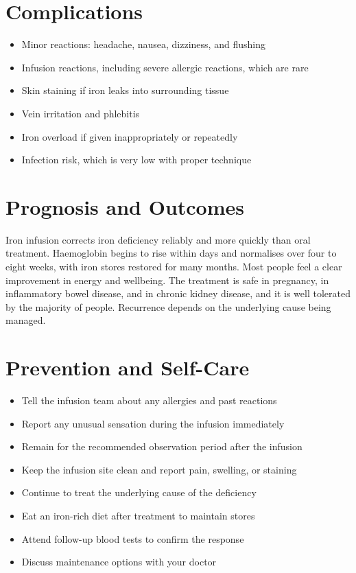 \section*{Complications}
\begin{itemize}
    \item Minor reactions: headache, nausea, dizziness, and flushing
    \item Infusion reactions, including severe allergic reactions, which are rare
    \item Skin staining if iron leaks into surrounding tissue
    \item Vein irritation and phlebitis
    \item Iron overload if given inappropriately or repeatedly
    \item Infection risk, which is very low with proper technique
\end{itemize}

\section*{Prognosis and Outcomes}
Iron infusion corrects iron deficiency reliably and more quickly than oral treatment. Haemoglobin begins to rise within days and normalises over four to eight weeks, with iron stores restored for many months. Most people feel a clear improvement in energy and wellbeing. The treatment is safe in pregnancy, in inflammatory bowel disease, and in chronic kidney disease, and it is well tolerated by the majority of people. Recurrence depends on the underlying cause being managed.

\section*{Prevention and Self-Care}
\begin{itemize}
    \item Tell the infusion team about any allergies and past reactions
    \item Report any unusual sensation during the infusion immediately
    \item Remain for the recommended observation period after the infusion
    \item Keep the infusion site clean and report pain, swelling, or staining
    \item Continue to treat the underlying cause of the deficiency
    \item Eat an iron-rich diet after treatment to maintain stores
    \item Attend follow-up blood tests to confirm the response
    \item Discuss maintenance options with your doctor
\end{itemize}


